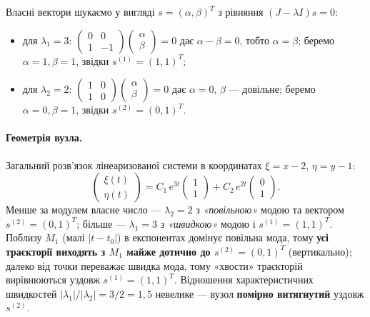 Власні вектори шукаємо у вигляді $s=(\alpha,\beta)^T$ з рівняння $(J-\lambda I)s=0$:
\begin{itemize}
    \item для $\lambda_1=3$: $\begin{pmatrix}0&0\\1&-1\end{pmatrix}\begin{pmatrix}\alpha\\ \beta\end{pmatrix}=0$ дає $\alpha-\beta=0$, тобто $\alpha=\beta$; беремо $\alpha=1,\beta=1$, звідки $s^{(1)}=(1,1)^T$;
    \item для $\lambda_2=2$: $\begin{pmatrix}1&0\\1&0\end{pmatrix}\begin{pmatrix}\alpha\\ \beta\end{pmatrix}=0$ дає $\alpha=0$, $\beta$ --- довільне; беремо $\alpha=0,\beta=1$, звідки $s^{(2)}=(0,1)^T$.
\end{itemize}

\paragraph{Геометрія вузла.}
Загальний розв'язок лінеаризованої системи в координатах $\xi=x-2$, $\eta=y-1$:
\begin{equation*}
\begin{pmatrix}\xi(t)\\ \eta(t)\end{pmatrix}
= C_1\,e^{3t}\begin{pmatrix}1\\1\end{pmatrix}
+ C_2\,e^{2t}\begin{pmatrix}0\\1\end{pmatrix}.
\end{equation*}
Менше за модулем власне число --- $\lambda_2=2$ з \emph{«повільною»} модою та вектором $s^{(2)}=(0,1)^T$; більше --- $\lambda_1=3$ з \emph{«швидкою»} модою і $s^{(1)}=(1,1)^T$.
Поблизу $M_1$ (малі $|t-t_0|$) в експонентах домінує повільна мода, тому \textbf{усі траєкторії виходять з $M_1$ майже дотично до $s^{(2)}=(0,1)^T$} (вертикально); далеко від точки переважає швидка мода, тому «хвости» траєкторій вирівнюються уздовж $s^{(1)}=(1,1)^T$.
Відношення характеристичних швидкостей $|\lambda_1|/|\lambda_2|=3/2=1{,}5$ невелике --- вузол \textbf{помірно витягнутий} уздовж $s^{(2)}$.

